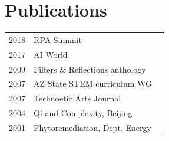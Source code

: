 \documentclass[letterpaper]{deedy-resume} %
\begin{document}
\begin{minipage}[t]{0.33\textwidth}
\section{Publications}

\begin{tabular}{rll}
2018 & RPA Summit\\
2017 & AI World\\
2009 & Filters \& Reflections anthology\\
2007 & AZ State STEM curriculum WG\\
2007 & Technoetic Arts Journal\\
2004 & Qi and Complexity, Beijing\\
2001 & Phytoremediation, Dept. Energy\\
\end{tabular}

\sectionspace %

\end{minipage} %
\hfill
\end{document}
